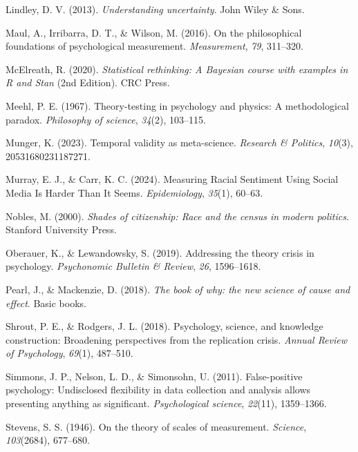 \documentclass[
  letterpaper,
  DIV=11,
  numbers=noendperiod]{scrreprt}
\newlength{\cslhangindent}
\newenvironment{CSLReferences}[2] %
 {\begin{list}{}{%
  \setlength{\itemindent}{0pt}
  \setlength{\leftmargin}{0pt}
  \setlength{\parsep}{0pt}
  \ifodd #1
   \setlength{\leftmargin}{\cslhangindent}
   \setlength{\itemindent}{-1\cslhangindent}
  \fi
  \setlength{\itemsep}{#2\baselineskip}}}
 {\end{list}}
\theoremstyle{definition}
\theoremstyle{remark}
\begin{document}
\begin{CSLReferences}{1}{0}
Lindley, D. V. (2013). \emph{Understanding uncertainty}. John Wiley \&
Sons.

Maul, A., Irribarra, D. T., \& Wilson, M. (2016). On the philosophical
foundations of psychological measurement. \emph{Measurement}, \emph{79},
311--320.

McElreath, R. (2020). \emph{Statistical rethinking: {A} {Bayesian}
course with examples in {R} and {Stan}} (2nd Edition). CRC Press.

Meehl, P. E. (1967). Theory-testing in psychology and physics: A
methodological paradox. \emph{Philosophy of science}, \emph{34}(2),
103--115.

Munger, K. (2023). Temporal validity as meta-science. \emph{Research \&
Politics}, \emph{10}(3), 20531680231187271.

Murray, E. J., \& Carr, K. C. (2024). Measuring Racial Sentiment Using
Social Media Is Harder Than It Seems. \emph{Epidemiology}, \emph{35}(1),
60--63.

Nobles, M. (2000). \emph{Shades of citizenship: Race and the census in
modern politics}. Stanford University Press.

Oberauer, K., \& Lewandowsky, S. (2019). Addressing the theory crisis in
psychology. \emph{Psychonomic Bulletin \& Review}, \emph{26},
1596--1618.

Pearl, J., \& Mackenzie, D. (2018). \emph{The book of why: the new
science of cause and effect}. Basic books.

Shrout, P. E., \& Rodgers, J. L. (2018). Psychology, science, and
knowledge construction: Broadening perspectives from the replication
crisis. \emph{Annual Review of Psychology}, \emph{69}(1), 487--510.

Simmons, J. P., Nelson, L. D., \& Simonsohn, U. (2011). False-positive
psychology: Undisclosed flexibility in data collection and analysis
allows presenting anything as significant. \emph{Psychological science},
\emph{22}(11), 1359--1366.

Stevens, S. S. (1946). On the theory of scales of measurement.
\emph{Science}, \emph{103}(2684), 677--680.


\end{CSLReferences}
\end{document}
